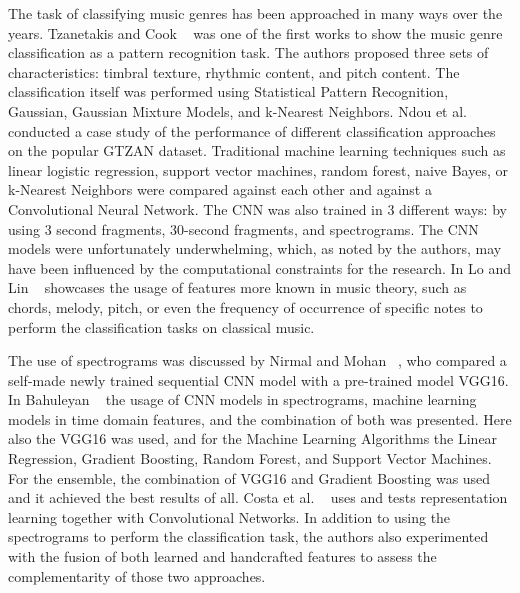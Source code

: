 \documentclass[runningheads]{llncs}
\begin{document}
The task of classifying music genres has been approached in many ways over the years. Tzanetakis and Cook ~\cite{gtzan} was one of the first works to show the music genre classification as a pattern recognition task. The authors proposed three sets of characteristics: timbral texture, rhythmic content, and pitch content. The classification itself was performed using Statistical Pattern Recognition, Gaussian, Gaussian Mixture Models, and k-Nearest Neighbors. Ndou et al. ~\cite{genre_classification_review} conducted a case study of the performance of different classification approaches on the popular GTZAN dataset. Traditional machine learning techniques such as linear logistic regression, support vector machines, random forest, naive Bayes, or k-Nearest Neighbors were compared against each other and against a Convolutional Neural Network. The CNN was also trained in 3 different ways: by using 3 second fragments, 30-second fragments, and spectrograms. The CNN models were unfortunately underwhelming, which, as noted by the authors, may have been influenced by the computational constraints for the research. In Lo and Lin ~\cite{genre_classification_content} showcases the usage of features more known in music theory, such as chords, melody, pitch, or even the frequency of occurrence of specific notes to perform the classification tasks on classical music. 

The use of spectrograms was discussed by Nirmal and Mohan ~\cite{genre_classification_spectrograms}, who compared a self-made newly trained sequential CNN model with a pre-trained model VGG16. In Bahuleyan ~\cite{genre_classification_ml} the usage of CNN models in spectrograms, machine learning models in time domain features, and the combination of both was presented. Here also the VGG16 was used, and for the Machine Learning Algorithms the Linear Regression, Gradient Boosting, Random Forest, and Support Vector Machines. For the ensemble, the combination of VGG16 and Gradient Boosting was used and it achieved the best results of all. Costa et al. ~\cite{cnn_spectrogram} uses and tests representation learning together with Convolutional Networks. In addition to using the spectrograms to perform the classification task, the authors also experimented with the fusion of both learned and handcrafted features to assess the complementarity of those two approaches. 
\end{document}

